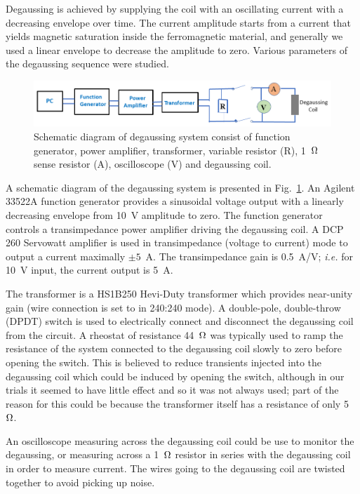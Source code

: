 Degaussing is achieved by supplying the coil with an oscillating
current with a decreasing envelope over time. The current amplitude
starts from a current that yields magnetic saturation inside the
ferromagnetic material, and generally we used a linear envelope to
decrease the amplitude to zero.  Various parameters of the degaussing
sequence were studied.

\begin{figure}%
\centering
\includegraphics[width=1.0\linewidth]{figures/degaussing_system}
\caption{Schematic diagram of degaussing system consist of function
  generator, power amplifier, transformer, variable resistor (R),
  1~$\ohm$ sense resistor (A), oscilloscope (V) and degaussing
  coil.\label{fig:schematic-of-degaussing_system}}
\end{figure}

A schematic diagram of the degaussing system is presented in
Fig.~\ref{fig:schematic-of-degaussing_system}.  An Agilent 33522A
function generator provides a sinusoidal voltage output with a
linearly decreasing envelope from 10~V amplitude to zero.  The
function generator controls a transimpedance power amplifier driving
the degaussing coil.
A DCP 260 Servowatt amplifier is used in transimpedance (voltage to
current) mode to output a current maximally $\pm 5$~A.  The
transimpedance gain is 0.5~A/V; {\it i.e.} for 10~V input, the current
output is 5~A.

The transformer is a HS1B250 Hevi-Duty transformer which provides
near-unity gain (wire connection is set to in 240:240 mode).  A
double-pole, double-throw (DPDT) switch is used to electrically
connect and disconnect the degaussing coil from the circuit.  A
rheostat of resistance 44~$\ohm$ was typically used to ramp the
resistance of the system connected to the degaussing coil slowly to
zero before opening the switch.  This is believed to reduce transients
injected into the degaussing coil which could be induced by opening
the switch, although in our trials it seemed to have little effect and
so it was not always used; part of the reason for this could be
because the transformer itself has a resistance of only 5~$\ohm$.

An oscilloscope measuring across the degaussing coil could be use to
monitor the degaussing, or measuring across a 1~$\ohm$ resistor in
series with the degaussing coil in order to measure current.  The
wires going to the degaussing coil are twisted together to avoid
picking up noise.

